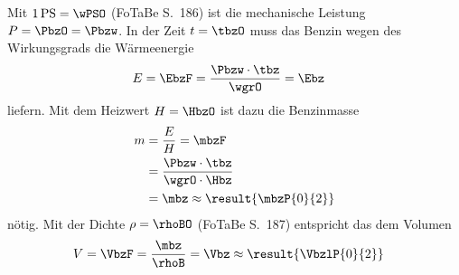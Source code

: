 Mit $1\,\mathrm{PS} = \wPSO$ (FoTaBe S.~186) ist die mechanische Leistung $P = \PbzO = \Pbzw$. In der Zeit $t = \tbzO$ muss das Benzin wegen des Wirkungsgrads die Wärmeenergie
\begin{align}
 E &= \EbzF = \frac{\Pbzw\cdot\tbz}{\wgrO} = \Ebz
\end{align}
liefern. Mit dem Heizwert $H = \HbzO$ ist dazu die Benzinmasse
\begin{align}
 m &= \frac{E}{H} = \mbzF \\
   &= \frac{\Pbzw\cdot\tbz}{\wgrO\cdot\Hbz} \\
   &= \mbz \approx \result{\mbzP{0}{2}}
\end{align}
nötig. Mit der Dichte $\rho = \rhoBO$ (FoTaBe S.~187) entspricht das dem Volumen
\begin{align}
 V &= \VbzF = \frac{\mbz}{\rhoB} = \Vbz \approx \result{\VbzlP{0}{2}}
\end{align}
